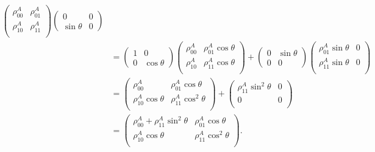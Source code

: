\documentclass{scrartcl}
\DeclareRobustCommand{\[}{\begin{equation}}
\DeclareRobustCommand{\]}{\end{equation}}
\begin{document}
\begin{enumerate}
\begin{align}
\begin{pmatrix}
                \rho^A_{00} & \rho^A_{01} \\
                \rho^A_{10} & \rho^A_{11} \\
            \end{pmatrix}
            \begin{pmatrix} 0 & 0 \\ \sin\theta & 0 \end{pmatrix} \\
            &= \begin{pmatrix} 1 & 0 \\ 0 & \cos\theta \end{pmatrix} 
            \begin{pmatrix}
                \rho^A_{00} & \rho^A_{01} \cos\theta \\
                \rho^A_{10} & \rho^A_{11} \cos\theta \\
            \end{pmatrix}
            +
            \begin{pmatrix} 0 & \sin\theta \\ 0 & 0 \end{pmatrix}
            \begin{pmatrix}
                \rho^A_{01} \sin\theta & 0 \\
                \rho^A_{11} \sin\theta & 0 \\
            \end{pmatrix} \\
            &= 
            \begin{pmatrix}
                \rho^A_{00} & \rho^A_{01} \cos\theta \\
                \rho^A_{10} \cos\theta & \rho^A_{11} \cos^2\theta \\
            \end{pmatrix}
            +
            \begin{pmatrix}
                \rho^A_{11} \sin^2\theta & 0 \\
                0 & 0 \\
            \end{pmatrix} \\
            &= 
            \begin{pmatrix}
                \rho^A_{00} + \rho^A_{11} \sin^2\theta & \rho^A_{01} \cos\theta \\
                \rho^A_{10} \cos\theta & \rho^A_{11} \cos^2\theta \\
            \end{pmatrix}.
    \end{align}
    

\end{enumerate}
\end{document}
